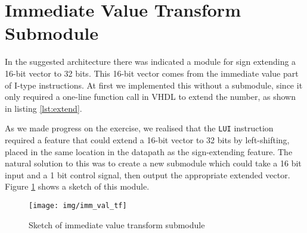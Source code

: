 \section{Immediate Value Transform Submodule}
In the suggested architecture there was indicated a module for sign extending a 16-bit vector to 32 bits.
This 16-bit vector comes from the immediate value part of I-type instructions.
At first we implemented this without a submodule,
since it only required a one-line function call in VHDL to extend the number,
as shown in listing \ref{lst:extend}.


As we made progress on the exercise,
we realised that the \texttt{LUI} instruction required a feature that could extend a 16-bit vector to 32 bits by left-shifting,
placed in the same location in the datapath as the sign-extending feature.
The natural solution to this was to create a new submodule which could take a 16 bit input and a 1 bit control signal, then output the appropriate extended vector.
Figure \ref{fig:imm_val_tf} shows a sketch of this module.

\begin{figure}[p]
    \centering
    \texttt{[image: img/imm\_val\_tf]}
    \caption{Sketch of immediate value transform submodule}
    \label{fig:imm_val_tf}
\end{figure}


